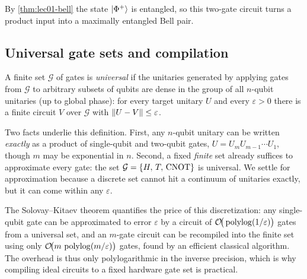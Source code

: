 By \cref{thm:lec01-bell} the state $\ket{\Phi^{+}}$ is entangled, so this two-gate
circuit turns a product input into a maximally entangled Bell pair.

\subsection{Universal gate sets and compilation}

\begin{definition}\label{def:lec01-universal}
A finite set $\mathcal{G}$ of gates is \emph{universal} if the unitaries generated by
applying gates from $\mathcal{G}$ to arbitrary subsets of qubits are dense in the
group of all $n$-qubit unitaries (up to global phase): for every target unitary $U$
and every $\varepsilon>0$ there is a finite circuit $V$ over $\mathcal{G}$ with
$\left\lVert U-V \right\rVert\le\varepsilon$.
\end{definition}

Two facts underlie this definition. First, any $n$-qubit unitary can be written
\emph{exactly} as a product of single-qubit and two-qubit gates,
$U=U_{m}U_{m-1}\cdots U_{1}$, though $m$ may be exponential in $n$. Second, a fixed
\emph{finite} set already suffices to approximate every gate: the set
$\mathcal{G}=\{H,\,T,\,\mathrm{CNOT}\}$ is universal. We settle for approximation because a
discrete set cannot hit a continuum of unitaries exactly, but it can come within any
$\varepsilon$.

\begin{remark}
The Solovay--Kitaev theorem quantifies the price of this discretization: any
single-qubit gate can be approximated to error $\varepsilon$ by a circuit of
$\mathcal{O}\!\big(\operatorname{polylog}(1/\varepsilon)\big)$ gates from a universal set, and an
$m$-gate circuit can be recompiled into the finite set using only
$\mathcal{O}\!\big(m\,\operatorname{polylog}(m/\varepsilon)\big)$ gates, found by an efficient classical
algorithm. The overhead is thus only polylogarithmic in the inverse precision, which
is why compiling ideal circuits to a fixed hardware gate set is practical.
\end{remark}

